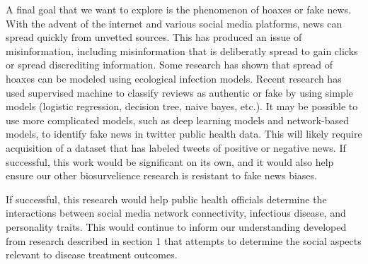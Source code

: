 A final goal that we want to explore is the phenomenon of hoaxes or fake news. With the advent of the internet and various social media platforms, news can spread quickly from unvetted sources. This has produced an issue of misinformation, including misinformation that is deliberatly spread to gain clicks or spread discrediting information. Some research has shown that spread of hoaxes can be modeled using ecological infection models\cite{tambuscio2015fact}. Recent research has used supervised machine to classify reviews as authentic or fake\cite{banerjee2015using} by using simple models (logistic regression, decision tree, naive bayes, etc.). It may be possible to use more complicated models, such as deep learning models and network-based models, to identify fake news in twitter public health data. This will likely require acquisition of a dataset that has labeled tweets of positive or negative news. If successful, this work would be significant on its own, and it would also help ensure our other biosurvelience research is resistant to fake news biases.

If successful, this research would help public health officials determine the interactions between social media network connectivity, infectious disease, and personality traits. This would continue to inform our understanding developed from research described in section 1 that attempts to determine the social aspects relevant to disease treatment outcomes.

